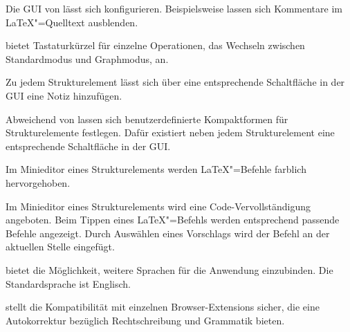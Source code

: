 
Die GUI von \texla{} lässt sich konfigurieren.
Beispielsweise lassen sich Kommentare im \LaTeX"=Quelltext ausblenden.


\texla{} bietet Tastaturkürzel für einzelne Operationen, \zB{} das Wechseln zwischen Standardmodus und Graphmodus, an.


Zu jedem Strukturelement lässt sich über eine entsprechende Schaltfläche in der GUI eine Notiz hinzufügen.


Abweichend von  lassen sich benutzerdefinierte Kompaktformen für Strukturelemente
festlegen.
Dafür existiert neben jedem Strukturelement eine entsprechende Schaltfläche in der GUI.


Im Minieditor eines Strukturelements werden \LaTeX"=Befehle farblich hervorgehoben.


Im Minieditor eines Strukturelements wird eine Code-Vervollständigung angeboten.
Beim Tippen eines \LaTeX"=Befehls werden entsprechend passende Befehle angezeigt.
Durch Auswählen eines Vorschlags wird der Befehl an der aktuellen Stelle eingefügt.

\clearpage


\texla{} bietet die Möglichkeit, weitere Sprachen für die Anwendung einzubinden.
Die Standardsprache ist Englisch.


\texla{} stellt die Kompatibilität mit einzelnen Browser-Extensions sicher, die eine Autokorrektur bezüglich
Rechtschreibung und Grammatik bieten.

